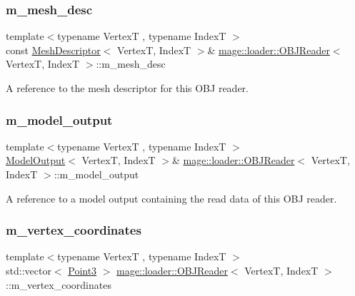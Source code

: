 \subsubsection{\texorpdfstring{m\+\_\+mesh\+\_\+desc}{m\_mesh\_desc}}
{\footnotesize\ttfamily template$<$typename VertexT , typename IndexT $>$ \\
const \hyperlink{classmage_1_1_mesh_descriptor}{Mesh\+Descriptor}$<$ VertexT, IndexT $>$\& \hyperlink{classmage_1_1loader_1_1_o_b_j_reader}{mage\+::loader\+::\+O\+B\+J\+Reader}$<$ VertexT, IndexT $>$\+::m\+\_\+mesh\+\_\+desc\hspace{0.3cm}{\ttfamily [private]}}

A reference to the mesh descriptor for this O\+BJ reader. \hypertarget{classmage_1_1loader_1_1_o_b_j_reader_a19ba3dbb5f6d5a7090d6b2cf12a4979a}{}\label{classmage_1_1loader_1_1_o_b_j_reader_a19ba3dbb5f6d5a7090d6b2cf12a4979a} 
\subsubsection{\texorpdfstring{m\+\_\+model\+\_\+output}{m\_model\_output}}
{\footnotesize\ttfamily template$<$typename VertexT , typename IndexT $>$ \\
\hyperlink{structmage_1_1_model_output}{Model\+Output}$<$ VertexT, IndexT $>$\& \hyperlink{classmage_1_1loader_1_1_o_b_j_reader}{mage\+::loader\+::\+O\+B\+J\+Reader}$<$ VertexT, IndexT $>$\+::m\+\_\+model\+\_\+output\hspace{0.3cm}{\ttfamily [private]}}

A reference to a model output containing the read data of this O\+BJ reader. \hypertarget{classmage_1_1loader_1_1_o_b_j_reader_adf05a751f03eeaccccf496710be4cae9}{}\label{classmage_1_1loader_1_1_o_b_j_reader_adf05a751f03eeaccccf496710be4cae9} 
\subsubsection{\texorpdfstring{m\+\_\+vertex\+\_\+coordinates}{m\_vertex\_coordinates}}
{\footnotesize\ttfamily template$<$typename VertexT , typename IndexT $>$ \\
std\+::vector$<$ \hyperlink{structmage_1_1_point3}{Point3} $>$ \hyperlink{classmage_1_1loader_1_1_o_b_j_reader}{mage\+::loader\+::\+O\+B\+J\+Reader}$<$ VertexT, IndexT $>$\+::m\+\_\+vertex\+\_\+coordinates\hspace{0.3cm}{\ttfamily [private]}}

